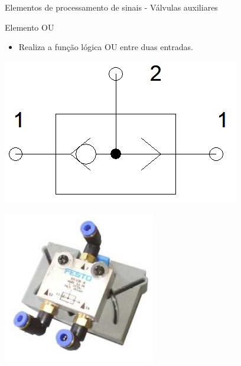 \begin{frame}{Elementos de processamento de sinais - Válvulas auxiliares}
	\begin{block}{Elemento OU}
		\begin{itemize}
			\item Realiza a função lógica OU entre duas entradas.
		\end{itemize}
	\end{block}
	
	\medskip
	
	\begin{minipage}[c]{0.48\linewidth}
		\centering
		\includegraphics[width=1\linewidth]{Figuras/Ch14/fig23}
	\end{minipage}
	\hfill
	\begin{minipage}[c]{0.48\linewidth}
		\centering
		\includegraphics[width=1\linewidth]{Figuras/Ch14/fig24}
	\end{minipage}
\end{frame}


